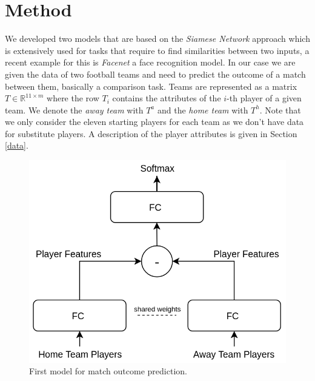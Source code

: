 \documentclass[a4paper]{article}
\begin{document}
\section{Method} \label{models}
We developed two models that are based on the \textit{Siamese Network} approach \cite{Bromley94} which is extensively used for tasks that require to find similarities between two inputs, a recent example for this is \textit{Facenet} \cite{Schroff15} a face recognition model. In our case we are given the data of two football teams and need to predict the outcome of a match between them, basically a comparison task. Teams are represented as a matrix $T \in \mathbb{R}^{11 \times m}$ where the row $T_i$ contains the attributes of the $i$-th player of a given team. We denote the \textit{away team} with $T^a$ and the \textit{home team} with $T^h$. Note that we only consider the eleven starting players for each team as we don't have data for substitute players. A description of the player attributes is given in Section \ref{data}. 

\begin{figure} 
\includegraphics[scale=0.30]{img/Siamese1.png}
\caption{First model for match outcome prediction.}
\label{fig:ffnet}
\end{figure}
\end{document}
